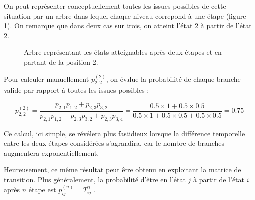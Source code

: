 \documentclass[12pt]{article}
\begin{document}
On peut représenter conceptuellement toutes les issues possibles de
cette situation par un arbre dans lequel chaque niveau correpond à une
étape (figure \ref{arbre}). On remarque que dans deux cas sur trois,
on atteint l'état 2 à partir de l'état 2.

\begin{figure}[H]
\centering


\caption{Arbre représentant les états atteignables après deux étapes
  et en partant de la position 2.}
\label{arbre}

\end{figure}

Pour calculer manuellement $p^{(2)}_{2,2}$, on évalue la probabilité
de chaque branche valide par rapport à toutes les issues possibles :

$$
p^{(2)}_{2,2}
= \frac{p_{2,1} p_{1,2} + p_{2,3} p_{3,2}}{p_{2,1} p_{1,2} + p_{2,3} p_{3,2} + p_{2,3} p_{3,4}}
= \frac{0.5 \times 1 + 0.5 \times 0.5}{0.5 \times 1 + 0.5 \times 0.5 + 0.5 \times 0.5}
= 0.75
$$
\vspace{0.5cm}

Ce calcul, ici simple, se révélera plus fastidieux lorsque la
différence temporelle entre les deux étapes considérées s'agrandira,
car le nombre de branches augmentera exponentiellement.

Heureusement, ce même résultat peut être obtenu en exploitant la
matrice de transition. Plus généralement, la probabilité d'être en
l'état $j$ à partir de l'état $i$ après $n$ étape est $p^{(n)}_{ij} =
T^n_{ij}$ \cite{snell}.
\end{document}

